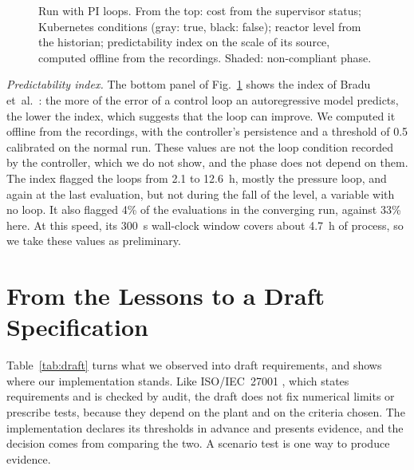 \documentclass[conference]{IEEEtran}
\begin{document}
\begin{figure}[t]
\caption{Run with PI loops. From the top: cost from the supervisor status; Kubernetes conditions (gray: true, black: false); reactor level from the historian; predictability index on the scale of its source, computed offline from the recordings. Shaded: non-compliant phase.}
\label{fig:exp27}
\end{figure}

\textit{Predictability index.} The bottom panel of Fig.~\ref{fig:exp27} shows the index of Bradu et~al.\ \cite{Bradu2018}: the more of the error of a control loop an autoregressive model predicts, the lower the index, which suggests that the loop can improve. We computed it offline from the recordings, with the controller's persistence and a threshold of 0.5 calibrated on the normal run. These values are not the loop condition recorded by the controller, which we do not show, and the phase does not depend on them. The index flagged the loops from 2.1 to 12.6~h, mostly the pressure loop, and again at the last evaluation, but not during the fall of the level, a variable with no loop. It also flagged 4\% of the evaluations in the converging run, against 33\% here. At this speed, its 300~s wall-clock window covers about 4.7~h of process, so we take these values as preliminary.

\section{From the Lessons to a Draft Specification}
\label{sec:draft}

Table~\ref{tab:draft} turns what we observed into draft requirements, and shows where our implementation stands. Like ISO/IEC~27001 \cite{ISO27001}, which states requirements and is checked by audit, the draft does not fix numerical limits or prescribe tests, because they depend on the plant and on the criteria chosen. The implementation declares its thresholds in advance and presents evidence, and the decision comes from comparing the two. A scenario test is one way to produce evidence.
\end{document}
